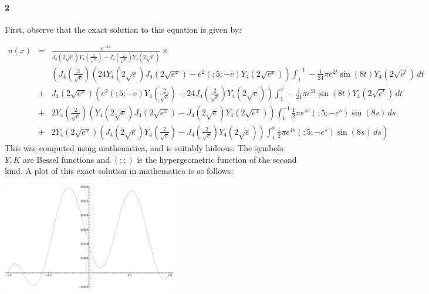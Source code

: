 \documentclass{article}
\begin{document}
\paragraph{2} First, observe that the exact solution to this equation is given by:

\sloppy

\begin{eqnarray*}
u(x) & = &   \frac{ e^{-2 x} }
{J_4\left(2 \sqrt{e}\right) Y_4\left(\frac{2}{\sqrt{e}}\right)-J_4\left(\frac{2}{\sqrt{e}}\right) Y_4\left(2 \sqrt{e}\right)} \times \\
& & 
  \left( J_4\left(\frac{2}{\sqrt{e}}\right) \left(24 Y_4\left(2 \sqrt{e} \right)
   J_4\left(2 \sqrt{e^x} \right)-e^2 (;5;-e) Y_4\left(2 \sqrt{e^x} \right) \right) \int_1^{-1} -\frac{1}{24} \pi  e^{2 t} \sin (8 t) Y_4\left(2 \sqrt{e^{t}} \right) \, dt  \right. \\
& + & J_4\left(2 \sqrt{e^x} \right) \left(e^2 (;5;-e) Y_4\left(\frac{2}{\sqrt{e}} \right)-24
   J_4\left(\frac{2}{\sqrt{e}} \right) Y_4\left(2 \sqrt{e} \right) \right) \int_1^x -\frac{1}{24} \pi  e^{2 t} \sin (8 t) Y_4\left(2 \sqrt{e^t} \right) \, dt \\
& + & 2 Y_4\left(\frac{2}{\sqrt{e}} \right) \left(Y_4\left(2 \sqrt{e}\right) J_4\left(2
   \sqrt{e^x}\right)-J_4\left(2 \sqrt{e}\right) Y_4\left(2 \sqrt{e^x}\right)\right) \int_1^{-1} \frac{1}{2} \pi  e^{4 s} \left(;5;-e^{s}\right) \sin (8 s) \, ds \\
& + & \left. 2 Y_4\left(2 \sqrt{e^x}\right) \left(J_4\left(2 \sqrt{e}\right)
   Y_4\left(\frac{2}{\sqrt{e}}\right)-J_4\left(\frac{2}{\sqrt{e}}\right) Y_4\left(2
   \sqrt{e}\right)\right) \int_1^x \frac{1}{2} \pi  e^{4 s} \left(;5;-e^{s}\right) \sin (8 s) \, ds \right)
\end{eqnarray*}
This was computed using mathematica, and is suitably hideous.  The symbols $Y,K$ are Bessel functions and $(;;)$ is the hypergeometric function of the second kind.  A plot of this exact solution in mathematica is as follows:

\includegraphics[width=3in]{plot2_mathematica.png}
\end{document}
